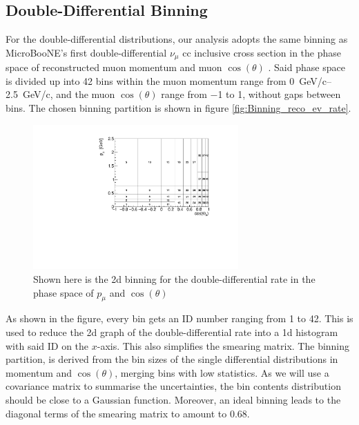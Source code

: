 \subsection{Double-Differential Binning} \label{sec:DoubleDifferentialBinning}
For the double-differential distributions, our analysis adopts the same binning as MicroBooNE's first double-differential $\nu_\mu$ \gls{cc} inclusive cross section in the phase space of reconstructed muon momentum and muon $\cos{(\theta)}$ \cite{MicroBooNEFirstCCInclPublished}. Said phase space is divided up into \num{42} bins within the muon momentum range from \SIrange{0}{2.5}{\GeV/c}, and the muon $\cos(\theta)$ range from \num{-1} to \num{1}, without gaps between bins. The chosen binning partition is shown in figure \ref{fig:Binning_reco_ev_rate}.
\begin{figure}[htbp]
  \centering
  \includegraphics[width=0.7\textwidth]{images/NewCCInclusive/xsec/h_2D_binning.pdf}
  \caption[2D Binning of the Double-Differential Rate]{Shown here is the \gls{2d} binning for the double-differential rate in the phase space of $p_\mu$ and $\cos{(\theta)}$}
  \label{fig:BinningDoubleDiff}
\end{figure}
As shown in the figure, every bin gets an ID number ranging from \num{1} to \num{42}. This is used to reduce the \gls{2d} graph of the double-differential rate into a \gls{1d} histogram with said ID on the $x$-axis. This also simplifies the smearing matrix. The binning partition, is derived from the bin sizes of the single differential distributions in momentum and $\cos{(\theta)}$, merging bins with low statistics. As we will use a covariance matrix to summarise the uncertainties, the bin contents distribution should be close to a Gaussian function. Moreover, an ideal binning leads to the diagonal terms of the smearing matrix to amount to \num{0.68}.

